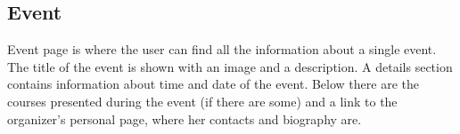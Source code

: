 \documentclass[../../DD.tex]{subfiles}
\begin{document}
	\subsection{Event}
		Event page is where the user can find all the information about a single event. The title of the event is shown with an image and a description. A details section contains information about time and date of the event. Below there are the courses presented during the event (if there are some) and a link to the organizer's personal page, where her contacts and biography are.
		\newline
\end{document}
